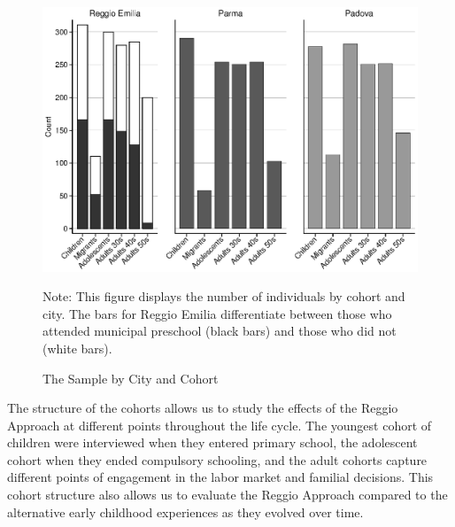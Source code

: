 \begin{figure}[H]
\begin{center}
\caption{The Sample by City and Cohort}\label{fig:sample}
	\includegraphics[width=.9\textwidth]{output/sample.eps}
\end{center}
\raggedright
Note: This figure displays the number of individuals by cohort and city. The bars for Reggio Emilia differentiate between those who attended municipal preschool (black bars) and those who did not (white bars). 
\end{figure}

\begin{table}[H]
\centering
{}
\end{table}

The structure of the cohorts allows us to study the effects of the Reggio Approach at different points throughout the life cycle. The youngest cohort of children were interviewed when they entered primary school, the adolescent cohort when they ended compulsory schooling, and the adult cohorts capture different points of engagement in the labor market and familial decisions. This cohort structure also allows us to evaluate the Reggio Approach compared to the alternative early childhood experiences as they evolved over time.

